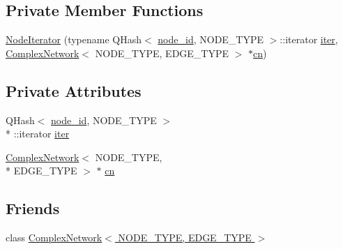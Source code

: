 \subsection*{Private Member Functions}
\begin{DoxyCompactItemize}
\item 
\hyperlink{class_complex_network_1_1_node_iterator_a0dc0f371918d5c93b9fa81ca0746ec75}{Node\+Iterator} (typename Q\+Hash$<$ \hyperlink{_complex_network_8hpp_a8323334ca788fde39682469321590d52}{node\+\_\+id}, N\+O\+D\+E\+\_\+\+T\+Y\+P\+E $>$\+::iterator \hyperlink{class_complex_network_1_1_node_iterator_af7716e564d8333613a93bdd821ad6a97}{iter}, \hyperlink{class_complex_network}{Complex\+Network}$<$ N\+O\+D\+E\+\_\+\+T\+Y\+P\+E, E\+D\+G\+E\+\_\+\+T\+Y\+P\+E $>$ $\ast$\hyperlink{class_complex_network_1_1_node_iterator_a128163df7d91ee8781ce99d61a47a6d0}{cn})
\end{DoxyCompactItemize}
\subsection*{Private Attributes}
\begin{DoxyCompactItemize}
\item 
Q\+Hash$<$ \hyperlink{_complex_network_8hpp_a8323334ca788fde39682469321590d52}{node\+\_\+id}, N\+O\+D\+E\+\_\+\+T\+Y\+P\+E $>$\\*
\+::iterator \hyperlink{class_complex_network_1_1_node_iterator_af7716e564d8333613a93bdd821ad6a97}{iter}
\item 
\hyperlink{class_complex_network}{Complex\+Network}$<$ N\+O\+D\+E\+\_\+\+T\+Y\+P\+E, \\*
E\+D\+G\+E\+\_\+\+T\+Y\+P\+E $>$ $\ast$ \hyperlink{class_complex_network_1_1_node_iterator_a128163df7d91ee8781ce99d61a47a6d0}{cn}
\end{DoxyCompactItemize}
\subsection*{Friends}
\begin{DoxyCompactItemize}
\item 
class \hyperlink{class_complex_network_1_1_node_iterator_ad8438fc5199b628ea294f77319026b6a}{Complex\+Network$<$ N\+O\+D\+E\+\_\+\+T\+Y\+P\+E, E\+D\+G\+E\+\_\+\+T\+Y\+P\+E $>$}
\end{DoxyCompactItemize}


